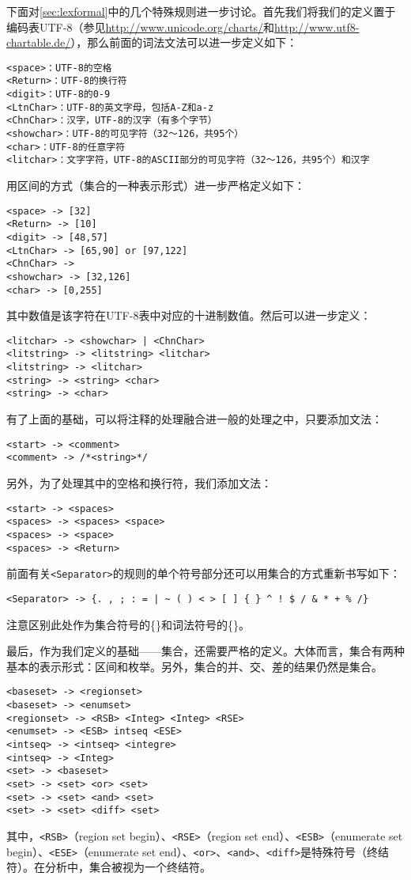 \documentclass{article}
\begin{document}
\begin{CJK}{UTF8}{gbsn}
下面对\ref{sec:lexformal}中的几个特殊规则进一步讨论。首先我们将我们的定义置于编码表UTF-8（参见\url{http://www.unicode.org/charts/}和\url{http://www.utf8-chartable.de/}），那么前面的词法文法可以进一步定义如下：
\begin{verbatim}
<space>：UTF-8的空格
<Return>：UTF-8的换行符
<digit>：UTF-8的0-9
<LtnChar>：UTF-8的英文字母，包括A-Z和a-z
<ChnChar>：汉字，UTF-8的汉字（有多个字节）
<showchar>：UTF-8的可见字符（32～126，共95个）
<char>：UTF-8的任意字符
<litchar>：文字字符，UTF-8的ASCII部分的可见字符（32～126，共95个）和汉字
\end{verbatim}
用区间的方式（集合的一种表示形式）进一步严格定义如下：
\begin{verbatim}
<space> -> [32]
<Return> -> [10]
<digit> -> [48,57]
<LtnChar> -> [65,90] or [97,122]
<ChnChar> -> 
<showchar> -> [32,126]
<char> -> [0,255]
\end{verbatim}
其中数值是该字符在UTF-8表中对应的十进制数值。然后可以进一步定义：
\begin{verbatim}
<litchar> -> <showchar> | <ChnChar>
<litstring> -> <litstring> <litchar>
<litstring> -> <litchar>
<string> -> <string> <char>
<string> -> <char>
\end{verbatim}
有了上面的基础，可以将注释的处理融合进一般的处理之中，只要添加文法：
\begin{verbatim}
<start> -> <comment>
<comment> -> /*<string>*/
\end{verbatim}
另外，为了处理其中的空格和换行符，我们添加文法：
\begin{verbatim}
<start> -> <spaces>
<spaces> -> <spaces> <space>
<spaces> -> <space>
<spaces> -> <Return>
\end{verbatim}
前面有关\verb|<Separator>|的规则的单个符号部分还可以用集合的方式重新书写如下：
\begin{verbatim}
<Separator> -> {. , ; : = | ~ ( ) < > [ ] { } ^ ! $ / & * + % /} 
\end{verbatim}
注意区别此处作为集合符号的\{\}和词法符号的\{\}。

最后，作为我们定义的基础——集合，还需要严格的定义。大体而言，集合有两种基本的表示形式：区间和枚举。另外，集合的并、交、差的结果仍然是集合。
\begin{verbatim}
<baseset> -> <regionset> 
<baseset> -> <enumset>
<regionset> -> <RSB> <Integ> <Integ> <RSE>
<enumset> -> <ESB> intseq <ESE>
<intseq> -> <intseq> <integre> 
<intseq> -> <Integ>
<set> -> <baseset>
<set> -> <set> <or> <set>
<set> -> <set> <and> <set>
<set> -> <set> <diff> <set>
\end{verbatim}
其中，\verb|<RSB>|（region set begin）、\verb|<RSE>|（region set end）、\verb|<ESB>|（enumerate set begin）、\verb|<ESE>|（enumerate set end）、\verb|<or>|、\verb|<and>|、\verb|<diff>|是特殊符号（终结符）。在分析中，集合被视为一个终结符。


\end{CJK}
\end{document}
